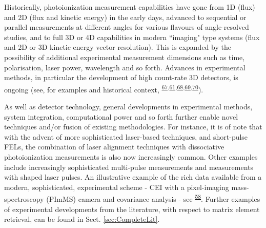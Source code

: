 \documentclass[10pt]{article}
\begin{document}
Historically, photoionization measurement capabilities have gone from 1D (flux) and 2D (flux and kinetic energy) in the early days, advanced to sequential or parallel measurements at different angles for various flavours of angle-resolved studies, and to full 3D or 4D capabilities in modern ``imaging" type systems (flux and 2D or 3D kinetic energy vector resolution). This is expanded by the possibility of additional experimental measurement dimensions such as time, polarisation, laser power, wavelength and so forth. Advances in experimental methods, in particular the development of high count-rate 3D detectors, is ongoing (see, for examples and historical context, \textsuperscript{\hyperref[csl:67]{67},\hyperref[csl:61]{61},\hyperref[csl:68]{68},\hyperref[csl:69]{69},\hyperref[csl:70]{70}}). 

As well as detector technology, general developments in experimental methods, system integration, computational power and so forth further enable novel techniques and/or fusion of existing methodologies. For instance, it is of note that with the advent of more sophisticated laser-based techniques, and short-pulse FELs, the combination of laser alignment techniques with dissociative photoionization measurements is also now increasingly common. Other examples include increasingly sophisticated multi-pulse measurements and measurements with shaped laser pulses. An illustrative example of the rich data available from a modern, sophisticated, experimental scheme - CEI with a pixel-imaging mass-spectroscopy (PImMS) camera and covariance analysis - see \textsuperscript{\hyperref[csl:58]{58}}. Further examples of experimental developments from the literature, with respect to matrix element retrieval, can be found in Sect. \ref{sec:CompleteLit}.


\end{document}

